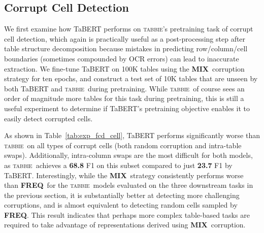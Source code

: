 \documentclass[11pt]{article}
\newcommand{\name}[0]{\textsc{tabbie}}
\newcommand{\freq}[0]{\textbf{FREQ}}
\newcommand{\mix}[0]{\textbf{MIX}}
\begin{document}
\subsection{Corrupt Cell Detection}
We first examine how TaBERT performs on \name's pretraining task of corrupt cell detection, which again is practically useful as a post-processing step after table structure decomposition \cite{tensmeyer-table, raja-table} because mistakes in predicting row/column/cell boundaries (sometimes compounded by OCR errors) can lead to inaccurate extraction. We fine-tune TaBERT on 100K tables using the \mix\ corruption strategy for ten epochs, and construct a test set of 10K tables that are unseen by both TaBERT and \name\ during pretraining. While \name\ of course sees an order of magnitude more tables for this task during pretraining, this is still a useful experiment to determine if TaBERT's pretraining objective enables it to easily detect corrupted cells.  

As shown in Table~\ref{tab:exp_fcd_cell}, TaBERT performs significantly worse than \name\ on all types of corrupt cells (both random corruption and intra-table swaps). Additionally, intra-column swaps are the most difficult for both models, as \name\ achieves a \textbf{68.8} F1 on this subset compared to just \textbf{23.7} F1 by TaBERT. Interestingly, while the \mix\ strategy consistently performs worse than \freq\ for the \name\ models evaluated on the three downstream tasks in the previous section, it is substantially better at detecting more challenging corruptions, and is almost equivalent to detecting random cells sampled by \freq. This result indicates that perhaps more complex table-based tasks are required to take advantage of representations derived using \mix\ corruption.
\end{document}
